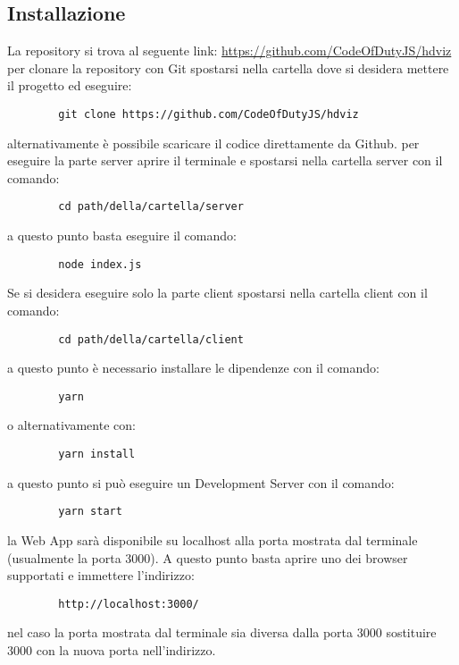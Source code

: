     \subsection{Installazione}
    La repository si trova al seguente link:
    \url{https://github.com/CodeOfDutyJS/hdviz}
    \\
    per clonare la repository con Git spostarsi nella cartella dove si desidera mettere il progetto ed eseguire:
    \begin{verbatim}
        git clone https://github.com/CodeOfDutyJS/hdviz
    \end{verbatim}
    alternativamente è possibile scaricare il codice direttamente da Github.
        per eseguire la parte server aprire il terminale e spostarsi nella cartella server con il comando:
        \begin{verbatim}
        cd path/della/cartella/server
        \end{verbatim}
        a questo punto basta eseguire il comando:
        \begin{verbatim}
        node index.js
        \end{verbatim}
        Se si desidera eseguire solo la parte client spostarsi nella cartella client con il comando:
        \begin{verbatim}
        cd path/della/cartella/client
        \end{verbatim}
        a questo punto è necessario installare le dipendenze con il comando: 
        \begin{verbatim}
        yarn
        \end{verbatim}
        o alternativamente con:
        \begin{verbatim}
        yarn install
        \end{verbatim}
        a questo punto si può eseguire un Development Server con il comando:
        \begin{verbatim}
        yarn start
        \end{verbatim}
        la Web App sarà disponibile su localhost alla porta mostrata dal terminale (usualmente la porta 3000). A questo punto basta aprire uno dei browser supportati e immettere l'indirizzo:
        \begin{verbatim}
        http://localhost:3000/
        \end{verbatim}
        nel caso la porta mostrata dal terminale sia diversa dalla porta 3000 sostituire 3000 con la nuova porta nell'indirizzo.